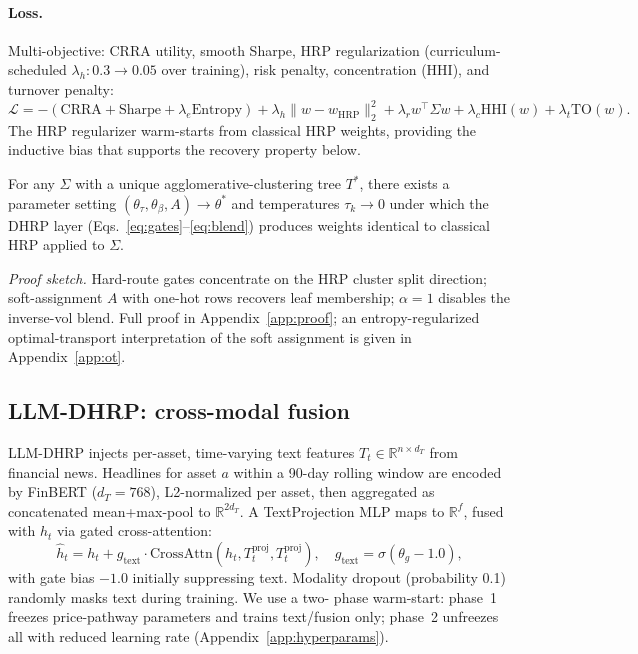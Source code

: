 \paragraph{Loss.}
Multi-objective: CRRA utility, smooth Sharpe, HRP regularization
(curriculum-scheduled $\lambda_h: 0.3 \to 0.05$ over training), risk
penalty, concentration (HHI), and turnover penalty:
\begin{equation}
\mathcal{L} = -(\mathrm{CRRA} + \mathrm{Sharpe} + \lambda_e \mathrm{Entropy})
+ \lambda_h \|w - w_{\text{HRP}}\|_2^2 + \lambda_r w^\top \Sigma w
+ \lambda_c \mathrm{HHI}(w) + \lambda_t \mathrm{TO}(w).
\end{equation}
The HRP regularizer warm-starts from classical HRP weights, providing
the inductive bias that supports the recovery property below.

\begin{proposition}
\label{prop:recovery}
For any $\Sigma$ with a unique agglomerative-clustering tree $T^*$,
there exists a parameter setting $(\theta_\tau, \theta_\beta, A) \to \theta^*$
and temperatures $\tau_k \to 0$ under which the DHRP layer
(Eqs.~\ref{eq:gates}--\ref{eq:blend}) produces weights identical to
classical HRP applied to $\Sigma$.
\end{proposition}

\noindent\textit{Proof sketch.} Hard-route gates concentrate on the HRP
cluster split direction; soft-assignment $A$ with one-hot rows recovers
leaf membership; $\alpha = 1$ disables the inverse-vol blend. Full
proof in Appendix~\ref{app:proof}; an entropy-regularized
optimal-transport interpretation of the soft assignment is given in
Appendix~\ref{app:ot}.

\subsection{LLM-DHRP: cross-modal fusion}
\label{sec:llm_dhrp_arch}

LLM-DHRP injects per-asset, time-varying text features
$T_t \in \mathbb{R}^{n \times d_T}$ from financial news. Headlines for
asset $a$ within a 90-day rolling window are encoded by FinBERT
\citep{Huang2023} ($d_T = 768$), L2-normalized per asset, then
aggregated as concatenated mean+max-pool to $\mathbb{R}^{2 d_T}$.
A TextProjection MLP maps to $\mathbb{R}^f$, fused with $h_t$ via gated
cross-attention:
\begin{equation}
\hat h_t = h_t + g_{\text{text}} \cdot
\mathrm{CrossAttn}(h_t, T_t^{\text{proj}}, T_t^{\text{proj}}),
\quad g_{\text{text}} = \sigma(\theta_g - 1.0),
\end{equation}
with gate bias $-1.0$ initially suppressing text. Modality dropout
(probability 0.1) randomly masks text during training. We use a two-
phase warm-start: phase~1 freezes price-pathway parameters and trains
text/fusion only; phase~2 unfreezes all with reduced learning rate
(Appendix~\ref{app:hyperparams}).
